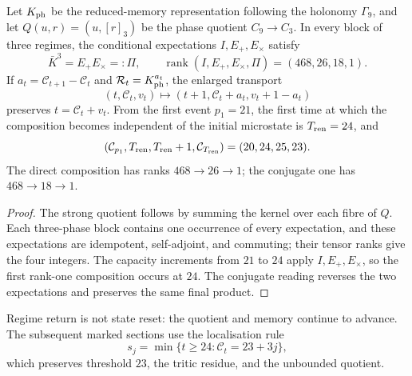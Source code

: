 \begin{proposition}
\label{v:prop:renovacion-capacidad-24}
Let $K_{\rm ph}$ be the reduced-memory representation following the holonomy
$\Gamma_9$, and let $Q(u,r)=(u,[r]_3)$ be the phase quotient
$C_9\to C_3$. In every block of three regimes, the conditional expectations
$I,E_+,E_\times$ satisfy
\[
 \bar K^3=E_+E_\times=:\Pi,\qquad
 \operatorname{rank}(I,E_+,E_\times,\Pi)=(468,26,18,1).
\]
If $a_t=\mathcal C_{t+1}-\mathcal C_t$ and
$\mathcal R_t=K_{\rm ph}^{a_t}$, the enlarged transport
\[
 (t,\mathcal C_t,v_t)\longmapsto
 (t+1,\mathcal C_t+a_t,v_t+1-a_t)
\]
preserves $t=\mathcal C_t+v_t$. From the first event $p_1=21$, the first
time at which the composition becomes independent of the initial microstate
is $T_{\rm ren}=24$, and
\begin{equation}
 (\mathcal C_{p_1},T_{\rm ren},T_{\rm ren}+1,
   \mathcal C_{T_{\rm ren}})=(20,24,25,23).
 \label{v:eq:tupla-renovacion-capacidad}
\end{equation}
The direct composition has ranks $468\to26\to1$; the conjugate one has
$468\to18\to1$.
\end{proposition}
\begin{proof}
The strong quotient follows by summing the kernel over each fibre of $Q$.
Each three-phase block contains one occurrence of every expectation, and
these expectations are idempotent, self-adjoint, and commuting; their tensor
ranks give the four integers. The capacity increments from $21$ to $24$
apply $I,E_+,E_\times$, so the first rank-one composition occurs at $24$.
The conjugate reading reverses the two expectations and preserves the same
final product.
\end{proof}

Regime return is not state reset: the quotient and memory continue to advance.
The subsequent marked sections use the localisation rule
\[
 s_j=\min\{t\ge24:\mathcal C_t=23+3j\},
\]
which preserves threshold $23$, the tritic residue, and the unbounded
quotient.
